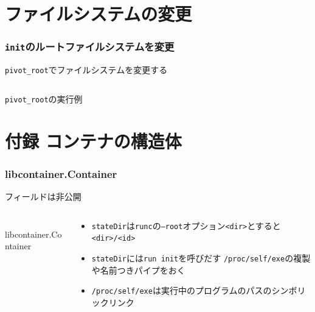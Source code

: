 \documentclass[unicode, 14pt, aspectratio=169]{beamer}
\begin{document}
\section{ファイルシステムの変更}
\begin{frame}[t]
  \frametitle{\texttt{init}のルートファイルシステムを変更}
  \texttt{pivot\_root}でファイルシステムを変更する
  \begin{center}
    \inputminted{sh}{code/pivot_root.sh}
    \texttt{pivot\_root}の実行例
  \end{center}
\end{frame}
\section{付録 コンテナの構造体}
\begin{frame}
  \frametitle{libcontainer.Container}
  フィールドは非公開
  \begin{columns}
    \begin{column}{0.5\textwidth}
      \begin{center}
        \inputminted{go}{code/container.go}
        libcontainer.Container\supercite{libcontainer}
      \end{center}
    \end{column}
    \begin{column}{0.5\textwidth}  %
      \begin{itemize}[leftmargin=0.2cm,label=$\circ$]
        \item \texttt{stateDir}は\texttt{runc}の\texttt{--root}オプション\texttt{<dir>}とすると\texttt{<dir>/<id>}
        \item \texttt{stateDir}には\texttt{run init}を呼びだす \texttt{/proc/self/exe}の複製や名前つきパイプをおく
        \item \texttt{/proc/self/exe}は実行中のプログラムのパスのシンボリックリンク
      \end{itemize}
    \end{column}
\end{columns}
\end{frame}
\end{document}
